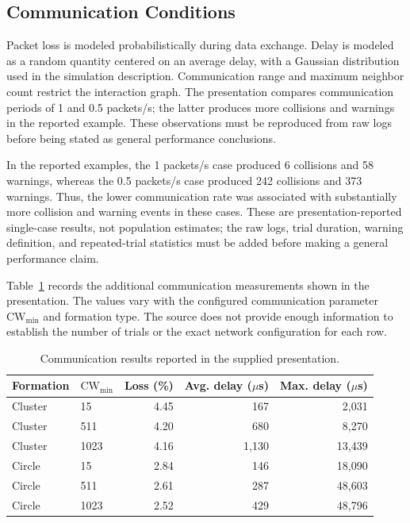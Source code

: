 \documentclass[journal]{IEEEtran}
\begin{document}
\subsection{Communication Conditions}
Packet loss is modeled probabilistically during data exchange. Delay is modeled as a random quantity centered on an average delay, with a Gaussian distribution used in the simulation description. Communication range and maximum neighbor count restrict the interaction graph. The presentation compares communication periods of 1 and 0.5 packets/s; the latter produces more collisions and warnings in the reported example. These observations must be reproduced from raw logs before being stated as general performance conclusions.

In the reported examples, the 1 packets/s case produced 6 collisions and 58 warnings, whereas the 0.5 packets/s case produced 242 collisions and 373 warnings. Thus, the lower communication rate was associated with substantially more collision and warning events in these cases. These are presentation-reported single-case results, not population estimates; the raw logs, trial duration, warning definition, and repeated-trial statistics must be added before making a general performance claim.

Table~\ref{tab:communication_results} records the additional communication measurements shown in the presentation. The values vary with the configured communication parameter $\mathrm{CW}_{\min}$ and formation type. The source does not provide enough information to establish the number of trials or the exact network configuration for each row.

\begin{table}[t]
\caption{Communication results reported in the supplied presentation.}
\label{tab:communication_results}
\centering
\begin{tabular}{llrrr}
\toprule
Formation & $\mathrm{CW}_{\min}$ & Loss (\%) & Avg. delay ($\mu$s) & Max. delay ($\mu$s) \\
\midrule
Cluster & 15 & 4.45 & 167 & 2,031 \\
Cluster & 511 & 4.20 & 680 & 8,270 \\
Cluster & 1023 & 4.16 & 1,130 & 13,439 \\
Circle & 15 & 2.84 & 146 & 18,090 \\
Circle & 511 & 2.61 & 287 & 48,603 \\
Circle & 1023 & 2.52 & 429 & 48,796 \\
\bottomrule
\end{tabular}
\end{table}
\end{document}
